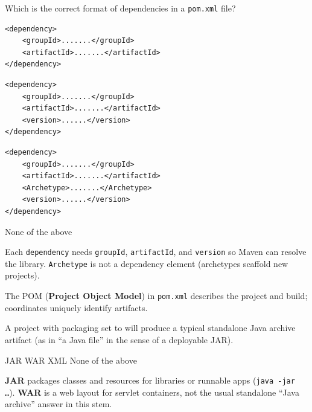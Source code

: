 \question[4]
Which is the correct format of dependencies in a \texttt{pom.xml} file?
\begin{choices}
  \choice
  \begin{minipage}[t]{0.88\linewidth}
\begin{lstlisting}[style=xml]
<dependency>
    <groupId>.......</groupId>
    <artifactId>.......</artifactId>
</dependency>
\end{lstlisting}
  \end{minipage}
  \CorrectChoice
  \begin{minipage}[t]{0.88\linewidth}
\begin{lstlisting}[style=xml]
<dependency>
    <groupId>.......</groupId>
    <artifactId>.......</artifactId>
    <version>......</version>
</dependency>
\end{lstlisting}
  \end{minipage}
  \choice
  \begin{minipage}[t]{0.88\linewidth}
\begin{lstlisting}[style=xml]
<dependency>
    <groupId>.......</groupId>
    <artifactId>.......</artifactId>
    <Archetype>.......</Archetype>
    <version>......</version>
</dependency>
\end{lstlisting}
  \end{minipage}
  \choice None of the above
\end{choices}
\begin{solution}
  Each \texttt{dependency} needs \texttt{groupId}, \texttt{artifactId}, and \texttt{version} so Maven can resolve the library. \texttt{Archetype} is not a dependency element (archetypes scaffold new projects).

  The POM (\textbf{Project Object Model}) in \texttt{pom.xml} describes the project and build; coordinates uniquely identify artifacts.
\end{solution}

\question[4]
A project with packaging set to \blank[3em] will produce a typical standalone Java archive artifact (as in ``a Java file'' in the sense of a deployable JAR).
\begin{choices}
  \CorrectChoice JAR
  \choice WAR
  \choice XML
  \choice None of the above
\end{choices}
\begin{solution}
  \textbf{JAR} packages classes and resources for libraries or runnable apps (\texttt{java -jar \ldots}). \textbf{WAR} is a web layout for servlet containers, not the usual standalone ``Java archive'' answer in this stem.
\end{solution}

